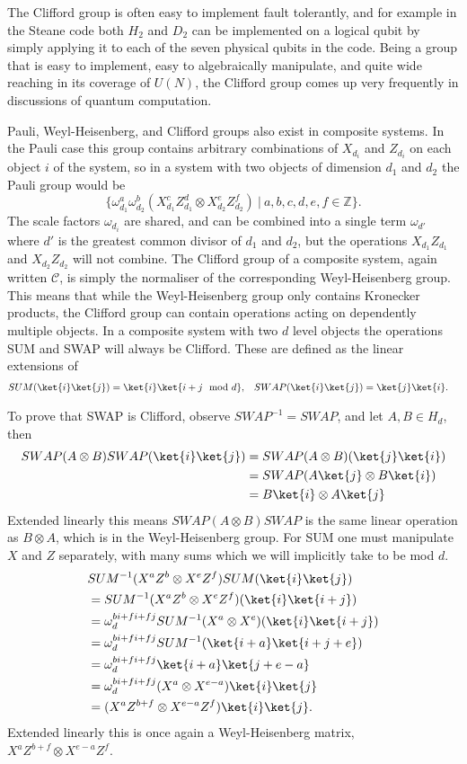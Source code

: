The Clifford group is often easy to implement fault tolerantly, and for example in the Steane code \cite{steane-code} both $H_2$ and $D_2$ can be implemented on a logical qubit by simply applying it to each of the seven physical qubits in the code. Being a group that is easy to implement, easy to algebraically manipulate, and quite wide reaching in its coverage of $U(N)$, the Clifford group comes up very frequently in discussions of quantum computation.

Pauli, Weyl-Heisenberg, and Clifford groups also exist in composite systems. In the Pauli case this group contains arbitrary combinations of $X_{d_i}$ and $Z_{d_i}$ on each object $i$ of the system, so in a system with two objects of dimension $d_1$ and $d_2$ the Pauli group would be
\[\{\omega_{d_1}^a\omega_{d_2}^b(X_{d_1}^cZ_{d_1}^d\otimes X_{d_2}^eZ_{d_2}^f)\ |\ a, b, c, d, e, f \in \mathbb{Z}\}.\]
The scale factors $\omega_{d_i}$ are shared, and can be combined into a single term $\omega_{d'}$ where $d'$ is the greatest common divisor of $d_1$ and $d_2$, but the operations $X_{d_1}Z_{d_1}$ and $X_{d_2}Z_{d_2}$ will not combine. The Clifford group of a composite system, again written $\mathcal{C}$, is simply the normaliser of the corresponding Weyl-Heisenberg group. This means that while the Weyl-Heisenberg group only contains Kronecker products, the Clifford group can contain operations acting on dependently multiple objects. In a composite system with two $d$ level objects the operations SUM and SWAP will always be Clifford. These are defined as the linear extensions of
\begin{align*}
	SUM(\ket{i}\ket{j}) = \ket{i}\ket{i+j \mod d}, &&& SWAP(\ket{i}\ket{j}) = \ket{j}\ket{i}.
\end{align*}

To prove that SWAP is Clifford, observe $SWAP^{-1} = SWAP$, and let $A, B \in H_d$, then
\begin{align*}
SWAP (A \otimes B) SWAP (\ket{i}\ket{j})
&= SWAP (A \otimes B)(\ket{j}\ket{i})
\\&=SWAP (A\ket{j} \otimes B\ket{i})
\\&=B\ket{i} \otimes A\ket{j}
\end{align*}
Extended linearly this means $SWAP (A \otimes B) SWAP$ is the same linear operation as $B \otimes A$, which is in the Weyl-Heisenberg group. For SUM one must manipulate $X$ and $Z$ separately, with many sums which we will implicitly take to be mod $d$.
\begin{align*}
&SUM^{-1} (X^aZ^b \otimes X^eZ^f) SUM (\ket{i}\ket{j})
\\&=SUM^{-1} (X^aZ^b \otimes X^eZ^f) (\ket{i}\ket{i+j})
\\&=\omega_d^{bi+fi+fj}SUM^{-1}(X^a \otimes X^e) (\ket{i}\ket{i+j})
\\&=\omega_d^{bi+fi+fj}SUM^{-1} (\ket{i+a}\ket{i+j+e})
\\&=\omega_d^{bi+fi+fj}\ket{i+a}\ket{j+e-a}
\\&=\omega_d^{bi+fi+fj}(X^a \otimes X^{e-a})\ket{i}\ket{j}
\\&=(X^aZ^{b+f} \otimes X^{e-a}Z^f)\ket{i}\ket{j}.
\end{align*}
Extended linearly this is once again a Weyl-Heisenberg matrix, $X^aZ^{b+f} \otimes X^{e-a}Z^f$.


